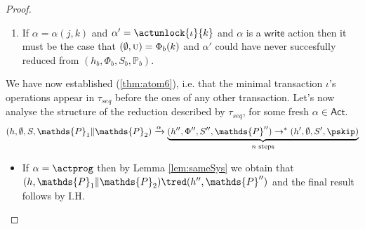 \begin{thm}
{\begin{proof}
\begin{enumerate}[label=({\roman*})]
	\item If $\alpha = \alpha(j, k)$ and $\alpha' = \actunlock{\iota}{k}$ and $\alpha$ is a $\mathsf{write}$ action then it must be the case that $(\emptyset, \textsc{u}) = \Phi_b(k)$ and $\alpha'$ could have never succesfully reduced from $(h_b, \Phi_b, S_b, \mathds{P}_b)$.
\end{enumerate}

We have now established (\ref{thm:atom6}), i.e. that the minimal transaction $\iota$'s operations appear in $\tau_{seq}$ before the ones of any other transaction. Let's now analyse the structure of the reduction described by $\tau_{seq}$, for some fresh $\alpha \in \mathsf{Act}$.
\[
	(h, \emptyset, S, \mathds{P}_1 \| \mathds{P}_2) \xrightarrow{\alpha}
	\underbrace{(h'', \Phi'', S'', \mathds{P}'') \rightarrow^* (h', \emptyset, S', \pskip)}_{n \text{ steps}}
\]
\begin{itemize}
	\item If $\alpha = \actprog$ then by Lemma \ref{lem:sameSys} we obtain that $(h, \mathds{P}_1 \| \mathds{P}_2) \tred (h'', \mathds{P}'')$ and the final result follows by I.H.
	

\end{itemize}
\end{proof}}
\end{thm}
